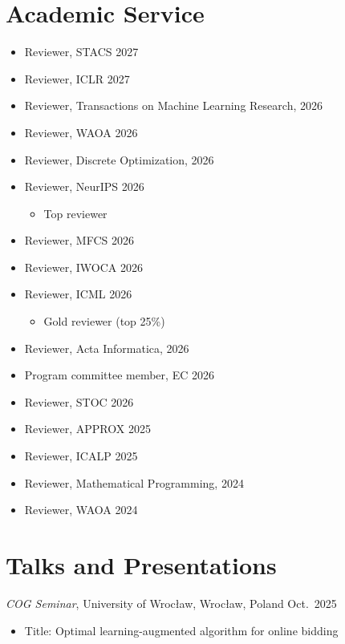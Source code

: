 \documentclass{article}
\newcommand{\killinitspace}{-0.7em}
\begin{document}
\section{Academic Service}
\begin{itemize}
\item Reviewer, STACS 2027
\item Reviewer, ICLR 2027
\item Reviewer, Transactions on Machine Learning Research, 2026
\item Reviewer, WAOA 2026
\item Reviewer, Discrete Optimization, 2026
\item Reviewer, NeurIPS 2026
\begin{itemize}
	\item[-] Top reviewer
\end{itemize}
\item Reviewer, MFCS 2026
\item Reviewer, IWOCA 2026
\item Reviewer, ICML 2026
\begin{itemize}
	\item[-] Gold reviewer (top 25\%)
\end{itemize}
\item Reviewer, Acta Informatica, 2026
\item Program committee member, EC 2026
\item Reviewer, STOC 2026
\item Reviewer, APPROX 2025
\item Reviewer, ICALP 2025
\item Reviewer, Mathematical Programming, 2024
\item Reviewer, WAOA 2024
\end{itemize}

\section{Talks and Presentations}
\textsl{COG Seminar}, University of Wrocław, Wrocław, Poland  \hfill Oct.~2025
\vspace{\killinitspace}
\begin{itemize}
\item Title: Optimal learning-augmented algorithm for online bidding
\end{itemize}
\end{document}
